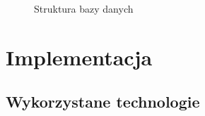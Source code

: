 \documentclass[8pt,a4paper,notitlepage]{article}
\begin{document}
\begin{figure}[H]
\begin{center}
\caption{Struktura bazy danych}
\end{center}
\end{figure}

\newpage
\section{Implementacja}
\subsection{Wykorzystane technologie}
\end{document}
